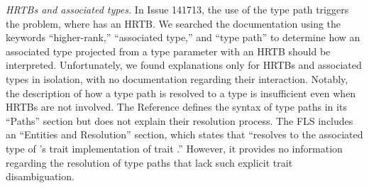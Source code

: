 {\it HRTBs and associated types.}
%
In Issue 141713, the use of the type path  triggers the problem,
where  has an HRTB.
%
We searched the documentation using the keywords ``higher-rank,'' ``associated
type,'' and ``type path'' to determine how an associated type projected from a
type parameter with an HRTB should be interpreted.
%
Unfortunately, we found explanations only for HRTBs and associated types in
isolation, with no documentation regarding their interaction.
%
Notably, the description of how a type path is resolved to a type is
insufficient even when HRTBs are not involved.
%
The Reference defines the syntax of type paths in its ``Paths'' section but does
not explain their resolution process.
%
The FLS includes an ``Entities and Resolution'' section, which states that  ``resolves to the associated type of 's trait implementation of
trait .''
%
However, it provides no information regarding the resolution of type paths that
lack such explicit trait disambiguation.



